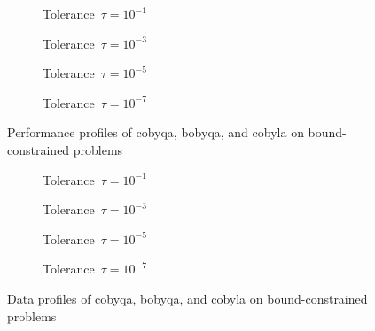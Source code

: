 \begin{figure}[ht]
    \centering
    \begin{subfigure}[b]{0.49\textwidth}
        \centering
        \caption{Tolerance~$\tau = 10^{-1}$}
    \end{subfigure}
    \hfill
    \begin{subfigure}[b]{0.49\textwidth}
        \centering
        \caption{Tolerance~$\tau = 10^{-3}$}
    \end{subfigure}
    \begin{subfigure}[b]{0.49\textwidth}
        \centering
        \caption{Tolerance~$\tau = 10^{-5}$}
    \end{subfigure}
    \hfill
    \begin{subfigure}[b]{0.49\textwidth}
        \centering
        \caption{Tolerance~$\tau = 10^{-7}$}
    \end{subfigure}
    \caption[Performance profiles on bound-constrained problems]{Performance profiles of \gls{cobyqa}, \gls{bobyqa}, and \gls{cobyla} on bound-constrained problems}
    \label{fig:perf-bound-constrained-problems}
\end{figure}

\begin{figure}[ht]
    \centering
    \begin{subfigure}[b]{0.49\textwidth}
        \centering
        \caption{Tolerance~$\tau = 10^{-1}$}
    \end{subfigure}
    \hfill
    \begin{subfigure}[b]{0.49\textwidth}
        \centering
        \caption{Tolerance~$\tau = 10^{-3}$}
    \end{subfigure}
    \begin{subfigure}[b]{0.49\textwidth}
        \centering
        \caption{Tolerance~$\tau = 10^{-5}$}
    \end{subfigure}
    \hfill
    \begin{subfigure}[b]{0.49\textwidth}
        \centering
        \caption{Tolerance~$\tau = 10^{-7}$}
    \end{subfigure}
    \caption[Data profiles on bound-constrained problems]{Data profiles of \gls{cobyqa}, \gls{bobyqa}, and \gls{cobyla} on bound-constrained problems}
    \label{fig:data-bound-constrained-problems}
\end{figure}


